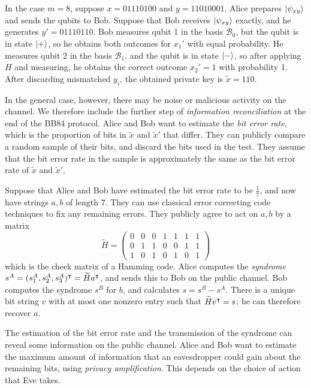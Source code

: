 In the case \( m = 8 \), suppose \( x = 01110100 \) and \( y = 11010001 \).
Alice prepares \( \ket{\psi_{xy}} \) and sends the qubits to Bob.
Suppose that Bob receives \( \ket{\psi_{xy}} \) exactly, and he generates \( y' = 01110110 \).
Bob measures qubit 1 in the basis \( \mathcal B_0 \), but the qubit is in state \( \ket{+} \), so he obtains both outcomes for \( x_1' \) with equal probability.
He measures qubit 2 in the basis \( \mathcal B_1 \), and the qubit is in state \( \ket{-} \), so after applying \( H \) and measuring, he obtains the correct outcome \( x_2' = 1 \) with probability 1.
After discarding mismatched \( y_i \), the obtained private key is \( \widetilde x = 110 \).

In the general case, however, there may be noise or malicious activity on the channel.
We therefore include the further step of \emph{information reconciliation} at the end of the BB84 protocol.
Alice and Bob want to estimate the \emph{bit error rate}, which is the proportion of bits in \( \widetilde x \) and \( \widetilde x' \) that differ.
They can publicly compare a random sample of their bits, and discard the bits used in the test.
They assume that the bit error rate in the sample is approximately the same as the bit error rate of \( \widetilde x \) and \( \widetilde x' \).

Suppose that Alice and Bob have estimated the bit error rate to be \( \frac{1}{7} \), and now have strings \( a, b \) of length \( 7 \).
They can use classical error correcting code techniques to fix any remaining errors.
They publicly agree to act on \( a, b \) by a matrix
\[ \widetilde H = \begin{pmatrix}
    0 & 0 & 0 & 1 & 1 & 1 & 1 \\
    0 & 1 & 1 & 0 & 0 & 1 & 1 \\
    1 & 0 & 1 & 0 & 1 & 0 & 1
\end{pmatrix} \]
which is the check matrix of a Hamming code.
Alice computes the \emph{syndrome} \( s^A = (s_1^A, s_2^A, s_3^A)^\intercal = \widetilde H a^\intercal \), and sends this to Bob on the public channel.
Bob computes the syndrome \( s^B \) for \( b \), and calculates \( s = s^B - s^A \).
There is a unique bit string \( v \) with at most one nonzero entry such that \( \widetilde H v^\intercal = s \); he can therefore recover \( a \).

The estimation of the bit error rate and the transmission of the syndrome can reveal some information on the public channel.
Alice and Bob want to estimate the maximum amount of information that an eavesdropper could gain about the remaining bits, using \emph{privacy amplification}.
This depends on the choice of action that Eve takes.

